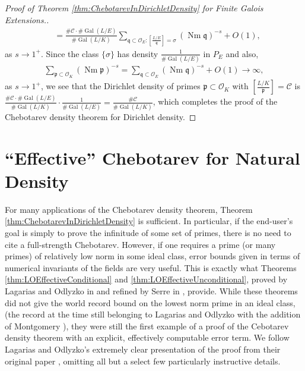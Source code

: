 \documentclass[12pt]{amsart}
\theoremstyle{definition}
\theoremstyle{remark}
\numberwithin{equation}{section}
\newcommand{\cC}{\mathcal C}
\newcommand{\cO}{\mathcal O}
\newcommand{\fkp}{\mathfrak p}
\newcommand{\fkq}{\mathfrak q}
\DeclareMathOperator{\norm}{Nm}
\newcommand{\artin}[2]{\left[ \frac{#1}{#2}\right]}
\DeclareMathOperator{\Gal}{Gal}
\begin{document}
\begin{proof}[Proof of Theorem \ref{thm:ChebotarevInDirichletDensity} for Finite Galois Extensions.]
\begin{align}
& = \frac{\# \cC \cdot \#\Gal(L/E)}{\# \Gal(L/K)}\sum_{\fkq \subset \cO_{E}: \artin{L/E}{\fkq} = \sigma} (\norm \fkq)^{-s} + O(1),
\end{align}
as $s \to 1^{+}$.
Since the class $\{\sigma\}$ has density $\frac{1}{\#\Gal(L/E)}$ in $P_{E}$ and also,
\begin{align}
\sum_{\fkp \subset \cO_{K}} (\norm \fkp)^{-s} = \sum_{\fkq \subset \cO_{E}} (\norm \fkq)^{-s} + O(1) \to \infty,
\end{align}
as $s \to 1^+$, we see that the Dirichlet density of primes $\fkp \subset \cO_{K}$ with $\artin{L/K}{\fkp} = \cC$ is $\frac{\# \cC \cdot \#\Gal(L/E)}{\# \Gal(L/K)} \cdot \frac{1}{\#\Gal(L/E)} = \frac{\# \cC}{\# \Gal(L/K)}$, which completes the proof of the Chebotarev density theorem for Dirichlet density.
\end{proof}


\section{``Effective'' Chebotarev for Natural Density} \label{sec:EffectiveChebotarev}

For many applications of the Chebotarev density theorem, Theorem \ref{thm:ChebotarevInDirichletDensity} is sufficient. In particular, if the end-user's goal is simply to prove the infinitude of some set of primes, there is no need to cite a full-strength Chebotarev. However, if one requires a prime (or many primes) of relatively low norm in some ideal class, error bounds given in terms of numerical invariants of the fields are very useful. This is exactly what Theorems \ref{thm:LOEffectiveConditional} and \ref{thm:LOEffectiveUnconditional}, proved by Lagarias and Odlyzko in \cite{LagariasOdlyzko77} and refined by Serre in \cite{Serre81}, provide. While these theorems did not give the world record bound on the lowest norm prime in an ideal class, (the record at the time still belonging to Lagarias and Odlyzko with the addition of Montgomery \cite{LagariasMontgomeryOdlyzko79}), they were still the first example of a proof of the Cebotarev density theorem with an explicit, effectively computable error term. We follow Lagarias and Odlyzko's extremely clear presentation of the proof from their original paper \cite{LagariasOdlyzko77}, omitting all but a select few particularly instructive details.
\end{document}
